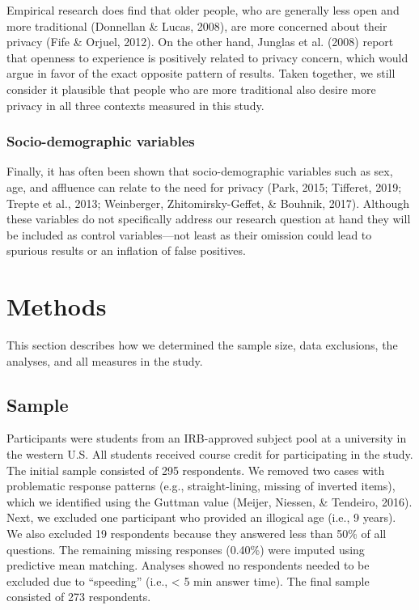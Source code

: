 \documentclass[man,floatsintext]{apa6}
\begin{document}
Empirical research does find that older people, who are generally less open and more traditional (Donnellan \& Lucas, 2008), are more concerned about their privacy (Fife \& Orjuel, 2012). On the other hand, Junglas et al. (2008) report that openness to experience is positively related to privacy concern, which would argue in favor of the exact opposite pattern of results. Taken together, we still consider it plausible that people who are more traditional also desire more privacy in all three contexts measured in this study.

\hypertarget{socio-demographic-variables}{%
\subsubsection{Socio-demographic variables}\label{socio-demographic-variables}}

Finally, it has often been shown that socio-demographic variables such as sex, age, and affluence can relate to the need for privacy (Park, 2015; Tifferet, 2019; Trepte et al., 2013; Weinberger, Zhitomirsky-Geffet, \& Bouhnik, 2017). Although these variables do not specifically address our research question at hand they will be included as control variables---not least as their omission could lead to spurious results or an inflation of false positives.

\hypertarget{methods}{%
\section{Methods}\label{methods}}

This section describes how we determined the sample size, data exclusions, the analyses, and all measures in the study.

\hypertarget{sample}{%
\subsection{Sample}\label{sample}}

Participants were students from an IRB-approved subject pool at a university in the western U.S. All students received course credit for participating in the study. The initial sample consisted of 295 respondents. We removed two cases with problematic response patterns (e.g., straight-lining, missing of inverted items), which we identified using the Guttman value (Meijer, Niessen, \& Tendeiro, 2016). Next, we excluded one participant who provided an illogical age (i.e., 9 years). We also excluded 19 respondents because they answered less than 50\% of all questions. The remaining missing responses (0.40\%) were imputed using predictive mean matching. Analyses showed no respondents needed to be excluded due to \enquote{speeding} (i.e., \textless{} 5 min answer time). The final sample consisted of 273 respondents.
\end{document}

